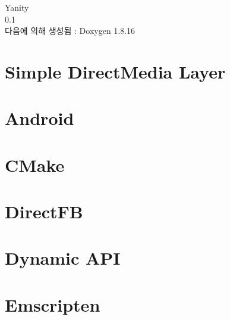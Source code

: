 \let\mypdfximage\pdfximage\def\pdfximage{\immediate\mypdfximage}\documentclass[twoside]{book}
\newcommand{\+}{\discretionary{\mbox{\scriptsize$\hookleftarrow$}}{}{}}
\newcommand{\clearemptydoublepage}{%
  \newpage{\pagestyle{empty}\cleardoublepage}%
}
\begin{document}
\hypersetup{pageanchor=false,
             bookmarksnumbered=true,
             pdfencoding=unicode
            }
\begin{titlepage}
\vspace*{7cm}
\begin{center}%
{\Large Yanity \\[1ex]\large 0.\+1 }\\
\vspace*{1cm}
{\large 다음에 의해 생성됨 \+:  Doxygen 1.8.16}\\
\end{center}
\end{titlepage}
\clearemptydoublepage
{}
\tableofcontents
\clearemptydoublepage
{}
\hypersetup{pageanchor=true}

\chapter{Simple Direct\+Media Layer}
\label{index}\hypertarget{index}{}
\chapter{Android}
\label{md__s_d_l_docs__r_e_a_d_m_e-android}

\chapter{C\+Make}
\label{md__s_d_l_docs__r_e_a_d_m_e-cmake}

\chapter{Direct\+FB}
\label{md__s_d_l_docs__r_e_a_d_m_e-directfb}

\chapter{Dynamic A\+PI}
\label{md__s_d_l_docs__r_e_a_d_m_e-dynapi}

\chapter{Emscripten}
\label{md__s_d_l_docs__r_e_a_d_m_e-emscripten}

\end{document}
